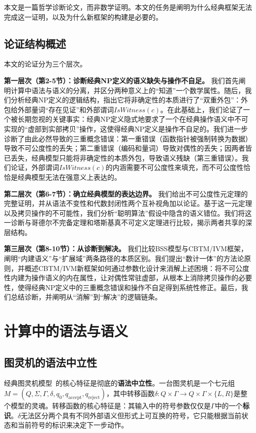 \documentclass{ctexart}
\begin{document}
	本文是一篇哲学诊断论文，而非数学证明。本文的任务是阐明为什么经典框架无法完成这一证明，以及为什么新框架的构建是必要的。
	
	\subsection{论证结构概述}
	
	本文的论证分为三个层次。
	
	\textbf{第一层次（第2-5节）：诊断经典NP定义的语义缺失与操作不自足。} 我们首先阐明计算中语法与语义的分离，并区分两种意义上的``知道''一个数学属性。随后，我们分析经典NP定义的逻辑结构，指出它将非确定性的本质进行了``双重外包''：外包给外部量词``存在见证''和外部谓词$IsWitness(c)$。在此基础上，我们论证了一个被长期忽视的关键事实：经典NP定义隐式地要求了一个在经典操作语义中不可实现的``虚部到实部拷贝''操作，这使得经典NP定义是操作不自足的。我们进一步诊断了由此必然导致的三重概念错误：第一重错误（函数指针被强制转换为数据）导致不可公度性的丢失；第二重错误（编码和量词）导致对偶性的丢失；因两者皆已丢失，经典模型只能将非确定性的本质外包，导致语义残缺（第三重错误）。我们论证，外部谓词$IsWitness(c)$的内涵需要不可公度性来填充，而不可公度性恰恰是经典模型无法在强意义上表达的。
	
	\textbf{第二层次（第6-7节）：确立经典模型的表达边界。} 我们给出不可公度性元定理的完整证明，并从语法不变性和代数封闭性两个互补视角加以论证。基于这一元定理以及拷贝操作的不可能性，我们分析``聪明算法''假设中隐含的语义错位。我们将这一诊断与哥德尔不完备定理和塔斯基真不可定义定理进行比较，揭示两者共享的深层结构。
	
	\textbf{第三层次（第8-10节）：从诊断到解决。} 我们比较BSS模型与CBTM/IVM框架，阐明``内建语义''与``扩展域''两条路径的本质区别。我们提出``数计一体''的方法论原则，并概述CBTM/IVM新框架如何通过参数化设计来消解上述困境：将不可公度性内建为操作语义的内在属性，让对偶性常驻虚部，从根本上消除拷贝操作的必要性，使得经典NP定义中的三重概念错误和操作不自足得到系统性修正。最后，我们总结诊断，并阐明从``消解''到``解决''的逻辑链条。
	
	\section{计算中的语法与语义}
	
	\subsection{图灵机的语法中立性}
	
	经典图灵机模型~\cite{turing1936}的核心特征是彻底的\textbf{语法中立性}。一台图灵机是一个七元组$M = (Q, \Sigma, \Gamma, \delta, q_0, q_{\text{accept}}, q_{\text{reject}})$，其中转移函数$\delta: Q \times \Gamma \to Q \times \Gamma \times \{L, R\}$是整个模型的灵魂。转移函数的核心特征是：其输入中的符号参数仅仅是$\Gamma$中的一个\textbf{标识}。$\delta$无法区分两个具有不同外部语义但形式上可互换的符号，它只能根据当前状态和当前符号的标识来决定下一步动作。
	
\end{document}
